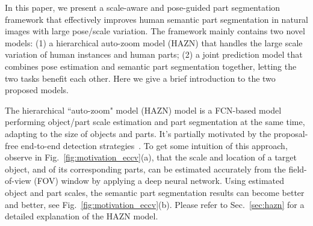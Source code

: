 In this paper, we present a scale-aware and pose-guided part segmentation framework that effectively improves human semantic part segmentation in natural images with large pose/scale variation. The framework mainly contains two novel models: (1) a hierarchical auto-zoom model (HAZN) that handles the large scale variation of human instances and human parts; (2) a joint prediction model that combines pose estimation and semantic part segmentation together, letting the two tasks benefit each other. Here we give a brief introduction to the two proposed models.

The hierarchical ``auto-zoom" model (HAZN) model is a FCN-based model performing object/part scale estimation and part segmentation at the same time, adapting to the size of objects and parts. It's partially motivated by the proposal-free end-to-end detection strategies~\cite{huang2015densebox,liang2015proposal,ren2015faster,redmon2016you}. To get some intuition of this approach, observe in Fig.~\ref{fig:motivation_eccv}(a), that the scale and location of a target object, and of its corresponding
parts, can be estimated accurately from the field-of-view (FOV) window
by applying a deep neural network. Using estimated object and part scales, the semantic part segmentation results can become better and better, see Fig.~\ref{fig:motivation_eccv}(b). Please refer to Sec.~\ref{sec:hazn} for a detailed explanation of the HAZN model. 

